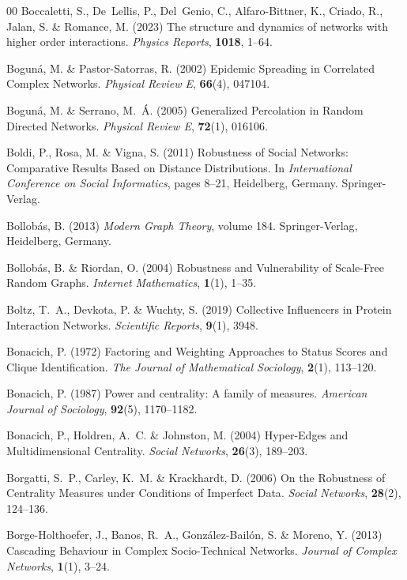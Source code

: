 \documentclass{comnet-mod}
\begin{document}
\begin{thebibliography}{00}
Boccaletti, S., De~Lellis, P., Del~Genio, C., Alfaro-Bittner, K., Criado, R.,
  Jalan, S. {\&} Romance, M. (2023)  The structure and dynamics of networks
  with higher order interactions. {\em {Physics Reports}}, \textbf{1018},
  1--64.

Bogun{\'a}, M. {\&} {Pastor-Satorras}, R. (2002)  {Epidemic Spreading in
  Correlated Complex Networks}. {\em {Physical Review E}}, \textbf{66}(4),
  047104.

Bogun{\'a}, M. {\&} Serrano, M.~{\'A}. (2005)  {Generalized Percolation in
  Random Directed Networks}. {\em {Physical Review E}}, \textbf{72}(1), 016106.

Boldi, P., Rosa, M. {\&} Vigna, S. (2011)  {Robustness of Social Networks:
  {{Comparative}} Results Based on Distance Distributions}. In {\em
  {International Conference on Social Informatics}}, pages 8--21, Heidelberg,
  Germany. {Springer-Verlag}.

Bollob{\'a}s, B. (2013) {\em {Modern {{Graph Theory}}}}, volume 184.
{Springer-Verlag}, {Heidelberg, Germany}.

Bollob{\'a}s, B. {\&} Riordan, O. (2004)  {Robustness and Vulnerability of
  Scale-Free Random Graphs}. {\em {Internet Mathematics}}, \textbf{1}(1),
  1--35.

Boltz, T.~A., Devkota, P. {\&} Wuchty, S. (2019)  {Collective Influencers in
  Protein Interaction Networks}. {\em {Scientific Reports}}, \textbf{9}(1),
  3948.

Bonacich, P. (1972)  {Factoring and Weighting Approaches to Status Scores and
  Clique Identification}. {\em {The Journal of Mathematical Sociology}},
  \textbf{2}(1), 113--120.

Bonacich, P. (1987)  {Power and centrality: A family of measures}. {\em
  {American Journal of Sociology}}, \textbf{92}(5), 1170--1182.

Bonacich, P., Holdren, A.~C. {\&} Johnston, M. (2004)  {Hyper-Edges and
  Multidimensional Centrality}. {\em {Social Networks}}, \textbf{26}(3),
  189--203.

Borgatti, S.~P., Carley, K.~M. {\&} Krackhardt, D. (2006)  {On the Robustness
  of Centrality Measures under Conditions of Imperfect Data}. {\em {Social
  Networks}}, \textbf{28}(2), 124--136.

{Borge-Holthoefer}, J., Banos, R.~A., {Gonz{\'a}lez-Bail{\'o}n}, S. {\&}
  Moreno, Y. (2013)  {Cascading Behaviour in Complex Socio-Technical Networks}.
  {\em {Journal of Complex Networks}}, \textbf{1}(1), 3--24.


\end{thebibliography}
\end{document}
